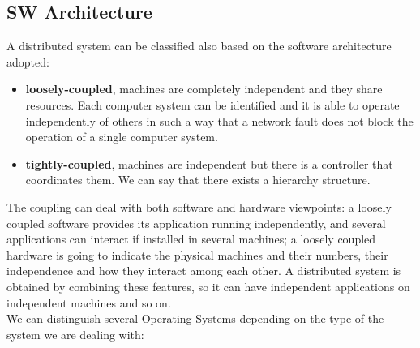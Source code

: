 \subsection{SW Architecture}
A distributed system can be classified also based on the software architecture adopted:
\begin{itemize}
    \item \textbf{loosely-coupled}, machines are completely independent and they share resources. Each computer system can be identified and it is able to operate independently of others in such a way that a network fault does not block the operation of a single computer system.  
    \item \textbf{tightly-coupled},  machines are independent but there is a controller that coordinates them. We can say that there exists a hierarchy structure.
\end{itemize}
The coupling can deal with both software and hardware viewpoints: a loosely coupled software provides its application running independently, and several applications can interact if installed in several machines; a loosely coupled hardware is going to indicate the physical machines and their numbers, their independence and how they interact among each other. A distributed system is obtained by combining these features, so it can have independent applications on independent machines and so on.\\
We can distinguish several Operating Systems depending on the type of the system we are dealing with:
